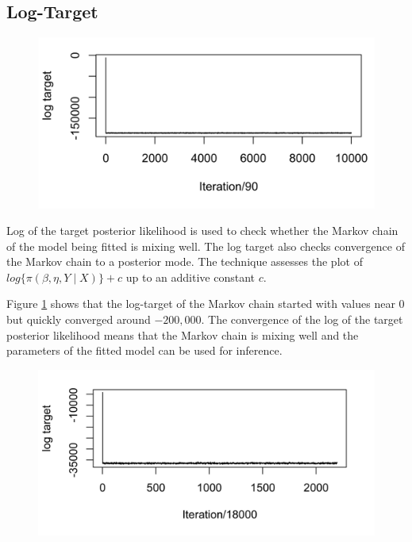 \subsection{Log-Target}

\begin{figure}[H]
    \begin{center}
        \includegraphics[scale=0.8]{Log Target Plot - ST - All Cases.png}
    \end{center}
     \label{fig:log-target-plot-for-all-cases}
\end{figure}

Log of the target posterior likelihood is used to check whether the Markov chain of the model being fitted is mixing well. 
The log target also checks convergence of the Markov chain to a posterior mode. 
The technique assesses the plot of $log\lbrace \pi\left( \beta, \eta, Y \mid X \right) \rbrace + c$ up to an additive constant $c$.

Figure \ref{fig:log-target-plot-for-all-cases} shows that the log-target of the Markov chain started with values near $0$ but quickly converged around $-200,000$. 
The convergence of the log of the target posterior likelihood means that the Markov chain is mixing well and the parameters of the fitted model can be used for inference.

\begin{figure}[H]
    \begin{center}
        \includegraphics[scale=1]{Log Target - Multi-type.png}
    \end{center}
     \label{fig:log-target-plot-multi-type}
\end{figure}

